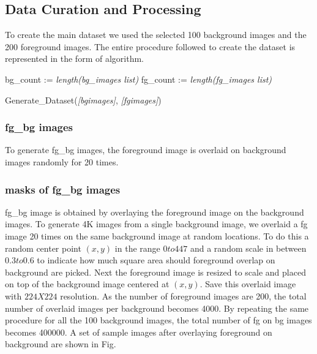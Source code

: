 \documentclass{article}
\begin{document}
\subsection{Data Curation and Processing}
To create the main dataset we used the selected 100 background images and the 200 foreground images. The entire procedure followed to create the dataset is represented in the form of algorithm.

\begin{algorithm}[H]
\SetAlgoLined
{} 
bg\_count := \textit{length(bg\_images list)} \;
fg\_count := \textit{length(fg\_images list)} \;

\caption{Generate\_Dataset(\textit{[bgimages]}, \textit{[fgimages]})}
\end{algorithm}


\subsubsection{fg\_bg images}
To generate fg\_bg images, the foreground image is overlaid on background images randomly for 20 times.
\subsubsection{masks of fg\_bg images}
fg\_bg image is obtained by overlaying the foreground image on the background images. To generate 4K images from a single background image, we overlaid a fg image 20 times on the same background image at random locations. To do this a random center point $(x, y)$ in the range $0 to 447$ and a random scale in between $0.3 to 0.6$ to indicate how much square area should foreground overlap on background are picked. Next the foreground image is resized to scale and placed on top of the background image centered at $(x, y)$. Save this overlaid image with $224 X 224$ resolution. As the number of foreground images are 200, the total number of overlaid images per background becomes 4000. By repeating the same procedure for all the 100 background images, the total number of fg on bg images becomes 400000. A set of sample images after overlaying foreground on background are shown in Fig.
\end{document}
